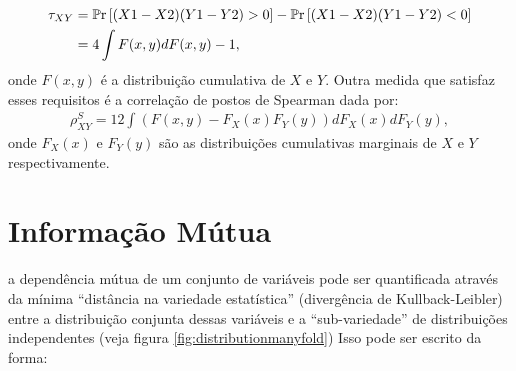 \begin{align*}
 \tau_{XY} &= \mathbb{P}\mathrm{r}\left[(X1-X2)(Y1 - Y2) > 0\right] - \mathbb{P}\mathrm{r}\left[(X1-X2)(Y1 - Y2) < 0\right] \\
      &= 4 \int F(x,y) dF(x,y) - 1  , 
\end{align*}
 onde $F(x,y)$ é a distribuição cumulativa de $X$ e $Y$. Outra medida que satisfaz esses requisitos é a correlação de postos de Spearman dada por:
\begin{align}
 \rho^{S}_{XY} = 12 \int \left(F(x,y) - F_{X}(x)F_Y(y)\right) dF_X(x) dF_Y(y),
\end{align}
onde $F_X(x)$ e $F_Y(y)$ são as distribuições cumulativas marginais de $X$ e $Y$ respectivamente. 

\section{Informação Mútua}
 a dependência mútua de um conjunto de variáveis pode ser quantificada através da mínima ``distância na variedade estatística'' (divergência de Kullback-Leibler) entre a distribuição conjunta dessas variáveis e a ``sub-variedade'' de distribuições independentes (veja figura \ref{fig:distributionmanyfold}) Isso pode ser escrito da forma:
